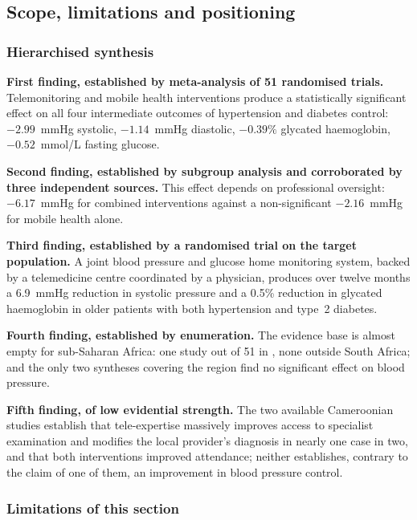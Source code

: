 \documentclass[12pt,a4paper,oneside]{report}
\begin{document}
\subsection{Scope, limitations and positioning}\label{sec:positioning}

\subsubsection{Hierarchised synthesis}

\textbf{First finding, established by meta-analysis of 51 randomised trials.} Telemonitoring and mobile health interventions produce a statistically significant effect on all four intermediate outcomes of hypertension and diabetes control: $-2.99$~mmHg systolic, $-1.14$~mmHg diastolic, $-0.39\%$ glycated haemoglobin, $-0.52$~mmol/L fasting glucose.

\textbf{Second finding, established by subgroup analysis and corroborated by three independent sources.} This effect depends on professional oversight: $-6.17$~mmHg for combined interventions against a non-significant $-2.16$~mmHg for mobile health alone.

\textbf{Third finding, established by a randomised trial on the target population.} A joint blood pressure and glucose home monitoring system, backed by a telemedicine centre coordinated by a physician, produces over twelve months a 6.9~mmHg reduction in systolic pressure and a 0.5\% reduction in glycated haemoglobin in older patients with both hypertension and type~2 diabetes.

\textbf{Fourth finding, established by enumeration.} The evidence base is almost empty for sub-Saharan Africa: one study out of 51 in \textcite{mao2020}, none outside South Africa; and the only two syntheses covering the region find no significant effect on blood pressure.

\textbf{Fifth finding, of low evidential strength.} The two available Cameroonian studies establish that tele-expertise massively improves access to specialist examination and modifies the local provider's diagnosis in nearly one case in two, and that both interventions improved attendance; neither establishes, contrary to the claim of one of them, an improvement in blood pressure control.

\subsubsection{Limitations of this section}
\end{document}
